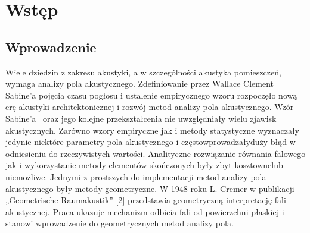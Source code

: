 \chapter{Wstęp}\label{cha:wstep}


\section{Wprowadzenie}\label{sec:wprowadzenie}

Wiele  dziedzin z zakresu akustyki, a w szczególności akustyka pomieszczeń, wymaga analizy pola akustycznego. Zdefiniowanie przez Wallace Clement Sabine’a pojęcia czasu pogłosu i ustalenie empirycznego wzoru rozpoczęło nową erę akustyki architektonicznej i rozwój metod analizy pola akustycznego. Wzór Sabine'a~\cite{b1} oraz jego kolejne przekształcenia nie uwzględniały wielu zjawisk akustycznych. Zarówno wzory empiryczne  jak i metody statystyczne wyznaczały jedynie niektóre parametry pola akustycznego i częstowprowadzałyduży błąd w odniesieniu do rzeczywistych wartości. Analityczne rozwiązanie równania falowego  jak i wykorzystanie metody elementów skończonych były zbyt kosztownelub niemożliwe. Jednymi z prostszych do implementacji metod analizy pola akustycznego były metody geometryczne. W 1948 roku L. Cremer w publikacji „Geometrische Raumakustik” [2] przedstawia geometryczną interpretację fali akustycznej. Praca ukazuje mechanizm odbicia fali od powierzchni płaskiej i stanowi wprowadzenie do geometrycznych metod analizy pola.

